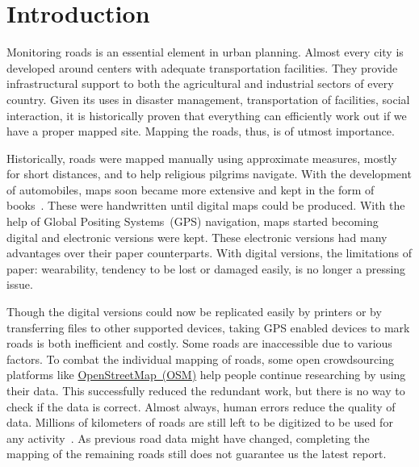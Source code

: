 \chapter{Introduction}\label{chapt:intro}

Monitoring roads is an essential element in urban planning. Almost every city is developed around centers with adequate transportation facilities. They provide infrastructural support to both the agricultural and industrial sectors of every country. Given its uses in disaster management, transportation of facilities, social interaction, it is historically proven that everything can efficiently work out if we have a proper mapped site. Mapping the roads, thus, is of utmost importance.

Historically, roads were mapped manually using approximate measures, mostly for short distances, and to help religious pilgrims navigate. With the development of automobiles, maps soon became more extensive and kept in the form of books~\cite{firstMapBooks}. These were handwritten until digital maps could be produced. With the help of Global Positing Systems~(GPS) navigation, maps started becoming digital and electronic versions were kept. These electronic versions had many advantages over their paper counterparts. With digital versions, the limitations of paper: wearability, tendency to be lost or damaged easily, is no longer a pressing issue. 

Though the digital versions could now be replicated easily by printers or by transferring files to other supported devices, taking GPS enabled devices to mark roads is both inefficient and costly. Some roads are inaccessible due to various factors. To combat the individual mapping of roads, some open crowdsourcing platforms like \href{https://www.openstreetmap.org/}{OpenStreetMap~(OSM)} help people continue researching by using their data. This successfully reduced the redundant work, but there is no way to check if the data is correct. Almost always, human errors reduce the quality of data. Millions of kilometers of roads are still left to be digitized to be used for any activity~\cite{MapsDoneOSM}. As previous road data might have changed, completing the mapping of the remaining roads still does not guarantee us the latest report.

